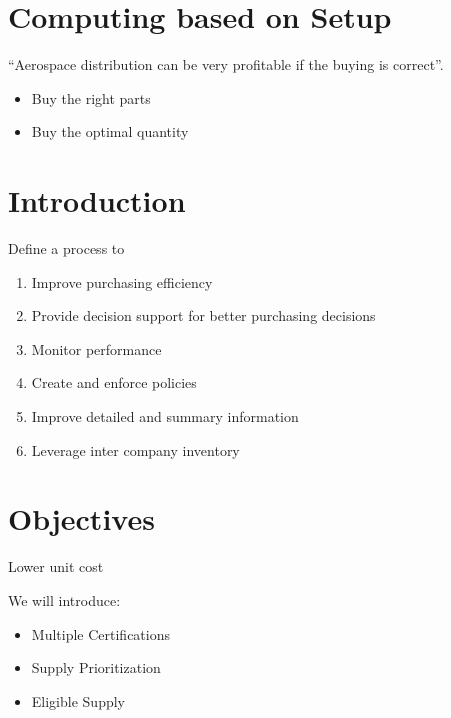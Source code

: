 \documentclass[letterpaper,10pt,english]{sphinxmanual}
\begin{document}
\section{Computing based on Setup}
\label{BusinessProcessReengineering:computing-based-on-setup}
``Aerospace distribution can be very profitable if the buying is
correct''.
\begin{itemize}
\item {} 
Buy the right parts

\item {} 
Buy the optimal quantity

\end{itemize}


\section{Introduction}
\label{BusinessProcessReengineering:introduction}
Define a process to
\begin{enumerate}
\item {} 
Improve purchasing efficiency

\item {} 
Provide decision support for better purchasing decisions

\item {} 
Monitor performance

\item {} 
Create and enforce policies

\item {} 
Improve detailed and summary information

\item {} 
Leverage inter company inventory

\end{enumerate}


\section{Objectives}
\label{BusinessProcessReengineering:id1}
Lower unit cost

We will introduce:
\begin{itemize}
\item {} 
Multiple Certifications

\item {} 
Supply Prioritization

\item {} 
Eligible Supply

\end{itemize}
\end{document}
